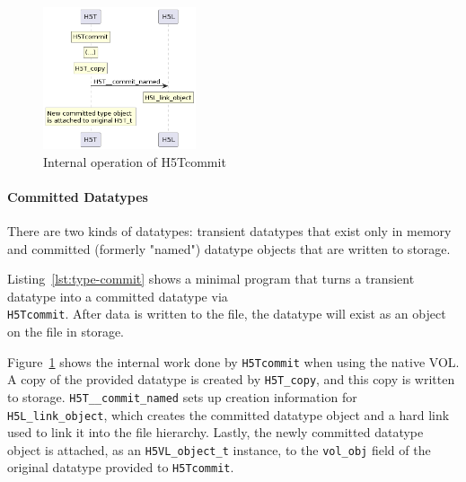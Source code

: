 \begin{figure}
\centering
\includegraphics[width=0.4\textwidth]{images/tour_5_uml_datatype_commit.png}
\caption{Internal operation of H5Tcommit}
\label{fig:tour-5-uml-datatype-commit}
\end{figure}

\paragraph{Committed Datatypes} There are two kinds of datatypes: transient datatypes that exist only in memory and committed (formerly "named") datatype objects that are written to storage.

Listing~\ref{lst:type-commit} shows a minimal program that turns a transient datatype into a committed datatype via \\ \texttt{H5Tcommit}. After data is written to the file, the datatype will exist as an object on the file in storage.

Figure~\ref{fig:tour-5-uml-datatype-commit} shows the internal work done by \texttt{H5Tcommit} when using the native VOL. A copy of the provided datatype is created by \texttt{H5T\_copy}, and this copy is written to storage. \texttt{H5T\_\_commit\_named} sets up creation information for \texttt{H5L\_link\_object}, which creates the committed datatype object and a hard link used to link it into the file hierarchy. Lastly, the newly committed datatype object is attached, as an \texttt{H5VL\_object\_t} instance, to the \texttt{vol\_obj} field of the original datatype provided to \texttt{H5Tcommit}.

